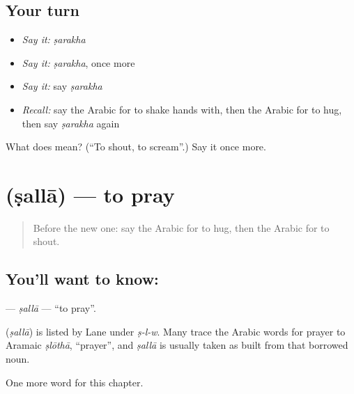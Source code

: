 \subsection*{Your turn}
\begin{itemize}
\raggedright
  \item \emph{Say it:} \emph{ṣarakha}
  \item \emph{Say it:} \emph{ṣarakha}, once more
  \item \emph{Say it:} say \emph{ṣarakha}
  \item \emph{Recall:} say the Arabic for to shake hands with, then the Arabic for to hug, then say \emph{ṣarakha} again
\end{itemize}

\begin{tcolorbox}[breakable,colback=teal!4,colframe=teal!35!black,title={Before you move on}]
What does  mean? (\textquotedblleft{}To shout, to scream\textquotedblright{}.) Say it once more.
\end{tcolorbox}
\section[\texorpdfstring{\ar{صلى} (ṣallā)}{صلى (ṣallā)}]{ (ṣallā) — to pray}

\label{lesson:AR-C164-salla}



\begin{quote}
Before the new one: say the Arabic for to hug, then the Arabic for to shout.
\end{quote}

\subsection*{You'll want to know: }
\textbf{} — \emph{ṣallā} — \textquotedblleft{}to pray\textquotedblright{}.

\begin{cousinweb}
\textbf{} (\emph{ṣallā}) is listed by Lane under \emph{ṣ-l-w}. Many trace the Arabic words for prayer to Aramaic \emph{ṣlōthā}, \textquotedblleft{}prayer\textquotedblright{}, and \emph{ṣallā} is usually taken as built from that borrowed noun.
\end{cousinweb}

\begin{grammarlens}[title={What you've built}]
One more word for this chapter.
\end{grammarlens}


